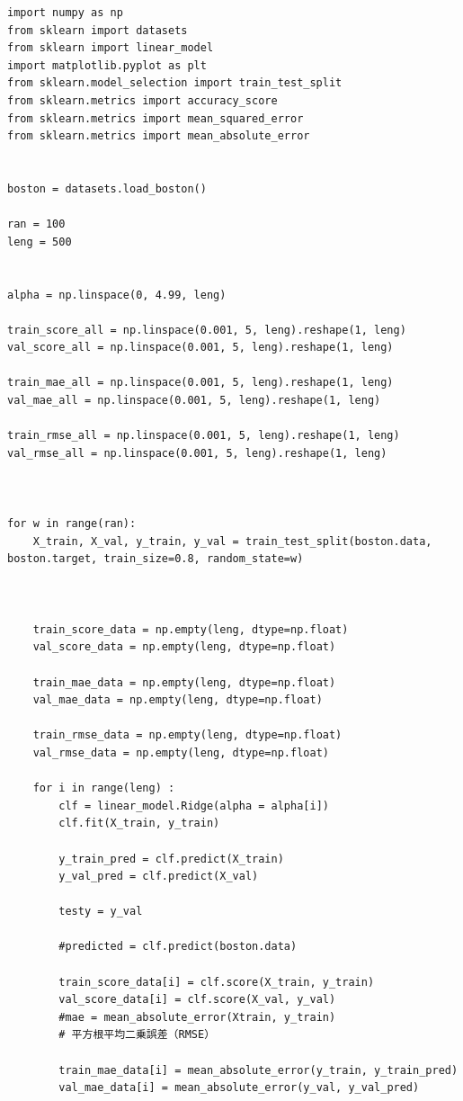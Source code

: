 \documentclass{jsarticle}
\begin{document}
\clearpage
\scriptsize
\begin{verbatim}
import numpy as np
from sklearn import datasets
from sklearn import linear_model
import matplotlib.pyplot as plt
from sklearn.model_selection import train_test_split
from sklearn.metrics import accuracy_score
from sklearn.metrics import mean_squared_error
from sklearn.metrics import mean_absolute_error


boston = datasets.load_boston()

ran = 100
leng = 500


alpha = np.linspace(0, 4.99, leng)

train_score_all = np.linspace(0.001, 5, leng).reshape(1, leng)
val_score_all = np.linspace(0.001, 5, leng).reshape(1, leng)

train_mae_all = np.linspace(0.001, 5, leng).reshape(1, leng)
val_mae_all = np.linspace(0.001, 5, leng).reshape(1, leng)

train_rmse_all = np.linspace(0.001, 5, leng).reshape(1, leng)
val_rmse_all = np.linspace(0.001, 5, leng).reshape(1, leng)



for w in range(ran): 
    X_train, X_val, y_train, y_val = train_test_split(boston.data, boston.target, train_size=0.8, random_state=w)
    

    
    train_score_data = np.empty(leng, dtype=np.float)
    val_score_data = np.empty(leng, dtype=np.float)

    train_mae_data = np.empty(leng, dtype=np.float)
    val_mae_data = np.empty(leng, dtype=np.float)

    train_rmse_data = np.empty(leng, dtype=np.float)
    val_rmse_data = np.empty(leng, dtype=np.float)

    for i in range(leng) :
        clf = linear_model.Ridge(alpha = alpha[i])
        clf.fit(X_train, y_train)
    
        y_train_pred = clf.predict(X_train)
        y_val_pred = clf.predict(X_val)
    
        testy = y_val
    
        #predicted = clf.predict(boston.data)
    
        train_score_data[i] = clf.score(X_train, y_train)
        val_score_data[i] = clf.score(X_val, y_val)
        #mae = mean_absolute_error(Xtrain, y_train)
        # 平方根平均二乗誤差（RMSE）
    
        train_mae_data[i] = mean_absolute_error(y_train, y_train_pred)
        val_mae_data[i] = mean_absolute_error(y_val, y_val_pred)
    

\end{verbatim}
\end{document}
